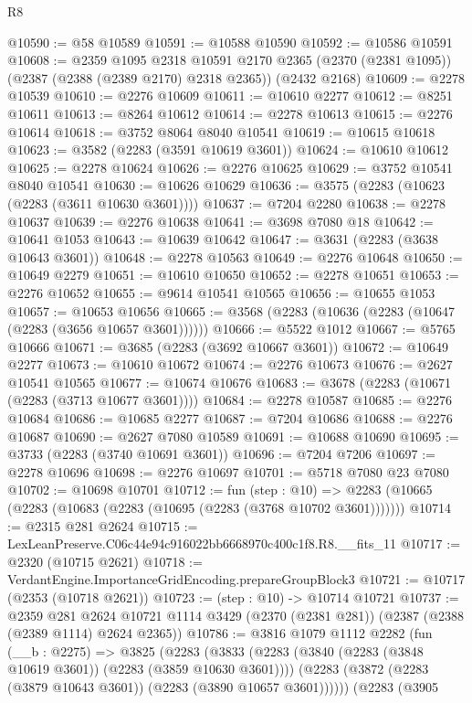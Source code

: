 \begin{lexlean}{R8}
\begin{coremodule}
@10590 := @58 @10589
@10591 := @10588 @10590
@10592 := @10586 @10591
@10608 := @2359
    @1095
    @2318
    @10591
    @2170
    @2365
    (@2370 (@2381 @1095))
    (@2387 (@2388 (@2389 @2170) @2318 @2365))
    (@2432 @2168)
@10609 := @2278 @10539
@10610 := @2276 @10609
@10611 := @10610 @2277
@10612 := @8251 @10611
@10613 := @8264 @10612
@10614 := @2278 @10613
@10615 := @2276 @10614
@10618 := @3752 @8064 @8040 @10541
@10619 := @10615 @10618
@10623 := @3582 (@2283 (@3591 @10619 @3601))
@10624 := @10610 @10612
@10625 := @2278 @10624
@10626 := @2276 @10625
@10629 := @3752 @10541 @8040 @10541
@10630 := @10626 @10629
@10636 := @3575 (@2283 (@10623 (@2283 (@3611 @10630 @3601))))
@10637 := @7204 @2280
@10638 := @2278 @10637
@10639 := @2276 @10638
@10641 := @3698 @7080 @18
@10642 := @10641 @1053
@10643 := @10639 @10642
@10647 := @3631 (@2283 (@3638 @10643 @3601))
@10648 := @2278 @10563
@10649 := @2276 @10648
@10650 := @10649 @2279
@10651 := @10610 @10650
@10652 := @2278 @10651
@10653 := @2276 @10652
@10655 := @9614 @10541 @10565
@10656 := @10655 @1053
@10657 := @10653 @10656
@10665 := @3568 (@2283 (@10636 (@2283 (@10647 (@2283 (@3656 @10657 @3601))))))
@10666 := @5522 @1012
@10667 := @5765 @10666
@10671 := @3685 (@2283 (@3692 @10667 @3601))
@10672 := @10649 @2277
@10673 := @10610 @10672
@10674 := @2276 @10673
@10676 := @2627 @10541 @10565
@10677 := @10674 @10676
@10683 := @3678 (@2283 (@10671 (@2283 (@3713 @10677 @3601))))
@10684 := @2278 @10587
@10685 := @2276 @10684
@10686 := @10685 @2277
@10687 := @7204 @10686
@10688 := @2276 @10687
@10690 := @2627 @7080 @10589
@10691 := @10688 @10690
@10695 := @3733 (@2283 (@3740 @10691 @3601))
@10696 := @7204 @7206
@10697 := @2278 @10696
@10698 := @2276 @10697
@10701 := @5718 @7080 @23 @7080
@10702 := @10698 @10701
@10712 := fun (step : @10) =>
  @2283 (@10665 (@2283 (@10683 (@2283 (@10695 (@2283 (@3768 @10702 @3601)))))))
@10714 := @2315 @281 @2624
@10715 := LexLeanPreserve.C06c44e94c916022bb6668970c400c1f8.R8.__fits_11
@10717 := @2320 (@10715 @2621)
@10718 := VerdantEngine.ImportanceGridEncoding.prepareGroupBlock3
@10721 := @10717 (@2353 (@10718 @2621))
@10723 := (step : @10) -> @10714 @10721
@10737 := @2359
    @281
    @2624
    @10721
    @1114
    @3429
    (@2370 (@2381 @281))
    (@2387 (@2388 (@2389 @1114) @2624 @2365))
@10786 := @3816
    @1079
    @1112
    @2282
    (fun (__b : @2275) =>
    @3825
      (@2283
        (@3833
          (@2283 (@3840 (@2283 (@3848 @10619 @3601)) (@2283 (@3859 @10630 @3601))))
          (@2283 (@3872 (@2283 (@3879 @10643 @3601)) (@2283 (@3890 @10657 @3601))))))
      (@2283
        (@3905

\end{coremodule}
\end{lexlean}
